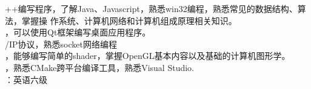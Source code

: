 \documentclass{resume} %
\begin{document}
\begin{rSection}{}


++编写程序，了解Java、Javascript，熟悉win32编程，熟悉常见的数据结构、算法，掌握操
作系统、计算机网络和计算机组成原理相关知识。\\
，可以使用Qt框架编写桌面应用程序。\\
/IP协议，熟悉socket网络编程\\
，能够编写简单的shader，掌握OpenGL基本内容以及基础的计算机图形学。\\
，熟悉CMake跨平台编译工具，熟悉Visual Studio. \\
：英语六级 

\end{rSection}

\end{document}
